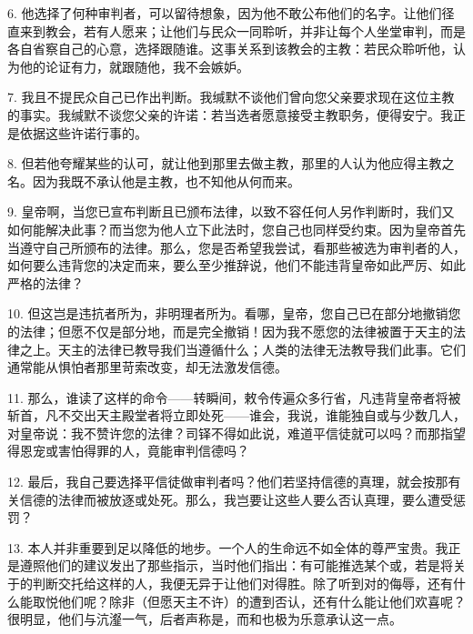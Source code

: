 6. 他选择了何种审判者，可以留待想象，因为他不敢公布他们的名字。让他们径直来到教会，若有人愿来；让他们与民众一同聆听，并非让每个人坐堂审判，而是各自省察自己的心意，选择跟随谁。这事关系到该教会的主教：若民众聆听他，认为他的论证有力，就跟随他，我不会嫉妒。\par

7. 我且不提民众自己已作出判断。我缄默不谈他们曾向您父亲要求现在这位主教的事实。我缄默不谈您父亲的许诺：若当选者愿意接受主教职务，便得安宁。我正是依据这些许诺行事的。\par

8. 但若他夸耀某些的认可，就让他到那里去做主教，那里的人认为他应得主教之名。因为我既不承认他是主教，也不知他从何而来。\par

9. 皇帝啊，当您已宣布判断且已颁布法律，以致不容任何人另作判断时，我们又如何能解决此事？而当您为他人立下此法时，您自己也同样受约束。因为皇帝首先当遵守自己所颁布的法律。那么，您是否希望我尝试，看那些被选为审判者的人，如何要么违背您的决定而来，要么至少推辞说，他们不能违背皇帝如此严厉、如此严格的法律？\par

10. 但这岂是违抗者所为，非明理者所为。看哪，皇帝，您自己已在部分地撤销您的法律；但愿不仅是部分地，而是完全撤销！因为我不愿您的法律被置于天主的法律之上。天主的法律已教导我们当遵循什么；人类的法律无法教导我们此事。它们通常能从惧怕者那里苛索改变，却无法激发信德。\par

11. 那么，谁读了这样的命令——转瞬间，敕令传遍众多行省，凡违背皇帝者将被斩首，凡不交出天主殿堂者将立即处死——谁会，我说，谁能独自或与少数几人，对皇帝说：我不赞许您的法律？司铎不得如此说，难道平信徒就可以吗？而那指望得恩宠或害怕得罪的人，竟能审判信德吗？\par

12. 最后，我自己要选择平信徒做审判者吗？他们若坚持信德的真理，就会按那有关信德的法律而被放逐或处死。那么，我岂要让这些人要么否认真理，要么遭受惩罚？\par

13. 本人并非重要到足以降低的地步。一个人的生命远不如全体的尊严宝贵。我正是遵照他们的建议发出了那些指示，当时他们指出：有可能推选某个或，若是将关于的判断交托给这样的人，我便无异于让他们对得胜。除了听到对的侮辱，还有什么能取悦他们呢？除非（但愿天主不许）的遭到否认，还有什么能让他们欢喜呢？很明显，他们与沆瀣一气，后者声称是，而和也极为乐意承认这一点。\par


